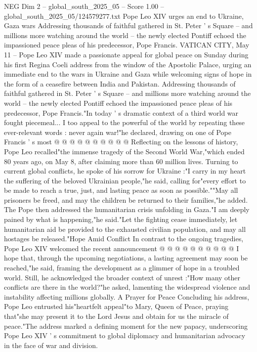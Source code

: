 \begin{textsample}{NEG Dim 2 – global\_south\_2025\_05 – Score 1.00 – global\_south\_2025\_05/124579277.txt}  \label{ex:f2_neg_152}
Pope Leo XIV urges an end to Ukraine, Gaza wars Addressing thousands of faithful gathered in St.
Peter ' s Square -- and millions more watching around the world -- the newly elected Pontiff echoed the impassioned peace pleas of his predecessor, Pope Francis.
VATICAN CITY, May 11 -- Pope Leo XIV made a passionate appeal for global peace on Sunday during his first Regina Coeli address from the window of the Apostolic Palace, urging an immediate end to the wars in Ukraine and Gaza while welcoming signs of hope in the form of a ceasefire between India and Pakistan.
Addressing thousands of faithful gathered in St.
Peter ' s Square -- and millions more watching around the world -- the newly elected Pontiff echoed the impassioned peace pleas of his predecessor, Pope Francis."In today ' s dramatic context of a third world war fought piecemeal...
I too appeal to the powerful of the world by repeating these ever-relevant words : never again war!"he declared, drawing on one of Pope Francis ' s most @ @ @ @ @ @ @ @ @ @ Reflecting on the lessons of history, Pope Leo recalled"the immense tragedy of the Second World War,"which ended 80 years ago, on May 8, after claiming more than 60 million lives.
Turning to current global conflicts, he spoke of his sorrow for Ukraine :"I carry in my heart the suffering of the beloved Ukrainian people,"he said, calling for"every effort to be made to reach a true, just, and lasting peace as soon as possible.""May all prisoners be freed, and may the children be returned to their families,"he added.
The Pope then addressed the humanitarian crisis unfolding in Gaza."I am deeply pained by what is happening,"he said."Let the fighting cease immediately, let humanitarian aid be provided to the exhausted civilian population, and may all hostages be released."Hope Amid Conflict In contrast to the ongoing tragedies, Pope Leo XIV welcomed the recent announcement @ @ @ @ @ @ @ @ @ @ I hope that, through the upcoming negotiations, a lasting agreement may soon be reached,"he said, framing the development as a glimmer of hope in a troubled world.
Still, he acknowledged the broader context of unrest :"How many other conflicts are there in the world?"he asked, lamenting the widespread violence and instability affecting millions globally.
A Prayer for Peace Concluding his address, Pope Leo entrusted his"heartfelt appeal"to Mary, Queen of Peace, praying that"she may present it to the Lord Jesus and obtain for us the miracle of peace."The address marked a defining moment for the new papacy, underscoring Pope Leo XIV ' s commitment to global diplomacy and humanitarian advocacy in the face of war and division.

\end{textsample}
